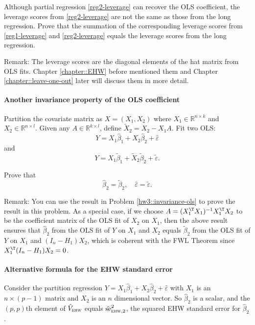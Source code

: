 Although partial regression \eqref{reg2-leverage} can recover the OLS coefficient, the leverage scores from  \eqref{reg2-leverage} are not the same as those from the long regression. Prove that the summation of the corresponding leverage scores from \eqref{reg1-leverage} and \eqref{reg2-leverage} equals the leverage scores from the long regression. 


Remark: The leverage scores are the diagonal elements of the hat matrix from OLS fits. Chapter \ref{chapter::EHW} before mentioned them and Chapter \ref{chapter::leave-one-out} later will discuss them in more detail. 



\paragraph{Another invariance property of the OLS coefficient}\label{hw7::invariance-ols-fwl}


Partition the covariate matrix as $X = (X_1, X_2)$ where $X_1 \in \mathbb{R}^{n\times k}$ and $X_2 \in \mathbb{R}^{n\times l}$. Given any $A\in \mathbb{R}^{k\times l}$, define $\tilde{X}_2 = X_2 - X_1A$. Fit two OLS:
$$
Y =   X_1 \hat{\beta}_1 +   X_2 \hat{\beta}_2  + \hat\varepsilon
$$
and
$$
Y =   X_1 \tilde{\beta}_1 +   \tilde{X}_2 \tilde{\beta}_2 + \tilde\varepsilon .
$$

Prove that
$$
\hat{\beta}_2 = \tilde{\beta}_2, \quad \hat\varepsilon = \tilde\varepsilon.
$$

 

Remark: You can use the result in Problem \ref{hw3::invariance-ols} to prove the result in this problem. As a special case, if we choose $A = (X_1^{\T}X_1)^{-1} X_1^{\T} X_2$ to be the coefficient matrix of the OLS fit of $X_2$ on $X_1$, then the above result ensures that $\hat{\beta}_2$ from the OLS fit of $Y$ on $X_1$ and $X_2$ equals $\tilde{\beta}_2$ from the OLS fit of $Y$ on  $X_1$ and $(I_n-H_1)X_2$, which is coherent with the FWL Theorem since $X_1^{\T} (I_n-H_1)X_2 = 0$.




\paragraph{Alternative formula for the EHW standard error}\label{hw7::alternative-ehw-se}


Consider the partition regression $Y = X_1 \hat\beta_1 + X_2 \hat\beta_2  + \hat{\varepsilon}$ with $X_1$ is an $n\times (p-1)$ matrix and  $X_2 $ is an $n$ dimensional vector. So $ \hat\beta_2$ is a scalar, and the $(p,p)$th element of $\hat{V}_\textsc{ehw}$ equals $\hat{\text{se}}_{\textsc{ehw}, 2}^2$, the squared EHW standard error for $ \hat\beta_2$. 

